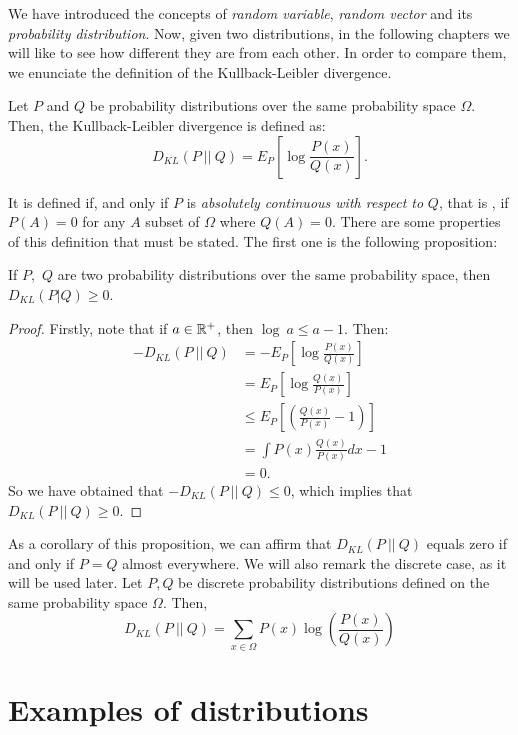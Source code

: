 We have introduced the concepts of \emph{random variable},  \emph{random vector} and its \emph{probability distribution}.
Now, given two distributions, in the following chapters we will like to see how different they are from each other.
In order to compare them, we enunciate the definition of the Kullback-Leibler divergence.

\begin{ndef}
Let $P$ and $Q$ be probability distributions over the same probability space $\Omega$. Then, the Kullback-Leibler divergence is defined as:
$$
D_{KL}(P \ || \ Q) = E_P\left[\log{\frac{P(x)}{Q(x)}}\right].
$$
\end{ndef}
It is defined if, and only if $P$ is \emph{absolutely continuous with respect to} $Q$, that is , if $P(A) = 0$ for any $A$ subset of $\Omega$ where $Q(A) = 0$.
 There are some properties of this definition that must be stated. The first one is the following proposition:

\begin{nprop}
If $P,$ $Q$ are two probability distributions over the same probability space, then $D_{KL}(P|Q) \geq 0$.
\end{nprop}
\begin{proof}
Firstly, note that if $a \in \mathbb{R}^+$, then $\log \ a \leq a-1$. Then:
\begin{align*}
-D_{KL}(P \ || \ Q) & = - E_P\left[\log{\frac{P(x)}{Q(x)}}\right] \\
             & = E_P\left[\log{\frac{Q(x)}{P(x)}}\right] \\
             & \leq E_P\left[\left(\frac{Q(x)}{P(x)} - 1\right)\right]\\
             & = \int P(x) \frac{Q(x)}{P(x)} dx -1 \\
             & = 0.
\end{align*}
So we have obtained that $-D_{KL}(P\ ||\ Q) \leq 0$, which implies that $D_{KL}(P\ || \ Q) \geq 0$.
\end{proof}
As a corollary of this proposition, we can affirm that $D_{KL}(P\ ||\ Q)$ equals zero if and only if $P = Q$ almost everywhere. 
We will also remark the discrete case, as it will be used later. Let $P,Q$ be discrete probability distributions defined on the same probability space $\Omega$. Then, 
$$
D_{KL}(P\ ||\ Q) = \sum_{x \in \Omega} P(x) \log \left( \frac{P(x)}{Q(x)}\right)
$$

\section{Examples of distributions}

